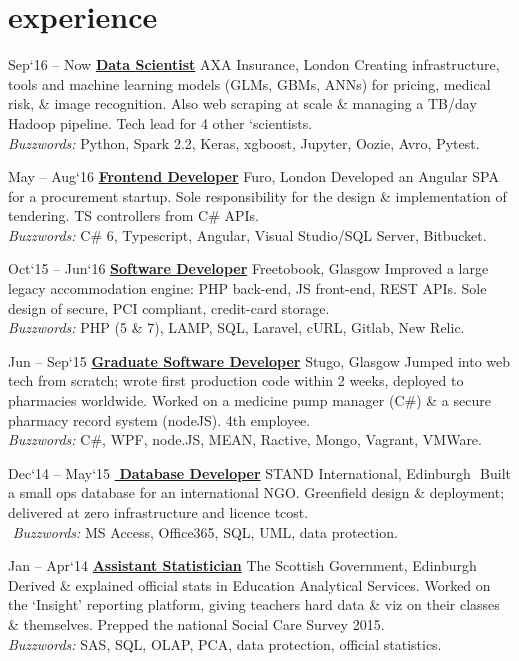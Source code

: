 \documentclass[]{friggeri-cv}
\newcommand{\axaJob}{\href{https://web.archive.org/web/20170113182017/https://www.kaggle.com/jobs/17128/axa-insurance-data-scientist-london}{\textbf{Data Scientist}}}%
\newcommand{\furoJob}{\href{https://web.archive.org/web/20170113184959/https://1.bp.blogspot.com/-8MTHkoAbScc/WHkd2EI0liI/AAAAAAAAC1k/0ZWr2XpO_ewW3Hd1RDHTfv3O_jki3bNigCLcB/s1600/furo.png}{\textbf{\textbf{Frontend Developer}}}}%
\newcommand{\freeJob}{\href{http://web.archive.org/web/20170113190649/http://www.freetobook.com/}{\textbf{Software Developer}}}%
\newcommand{\stugoJob}{\href{http://web.archive.org/web/20170113185418/http://stugo.co.uk/}{\textbf{Graduate Software Developer}}}%
\newcommand{\govJob}{\href{http://web.archive.org/web/20170113190449/http://www.gov.scot/Resource/0047/00478784.pdf}{\textbf{Assistant Statistician}}}%
\newcommand{\standJob}{\href{http://web.archive.org/web/20170113190135/http://standinternational.org/about-us}{\textbf{\,\,Database Developer}}}%
\begin{document}
\section{experience}
\begin{entrylist}
	\smallskip\smallskip
	\entry
	{Sep‘16 – Now}
	{\axaJob{}}
    {AXA Insurance, London}
    {Creating infrastructure, tools and machine learning models (GLMs, GBMs, ANNs) for pricing, medical risk, \& image recognition. Also web scraping at scale \& managing a TB/day Hadoop pipeline. Tech lead for 4 other `scientists.\\
     \textit{Buzzwords:}	Python, Spark 2.2, Keras, xgboost, Jupyter, Oozie, Avro,  Pytest. }		
    
    \smallskip\smallskip    \smallskip\smallskip \smallskip\smallskip
	\entry
	{May – Aug‘16}
	{\furoJob{}}
    {Furo, London}
    {Developed an Angular SPA for a procurement startup. Sole responsibility for the design \& implementation of tendering. TS controllers from C\# APIs. \\
    \textit{Buzzwords:}	C\# 6, Typescript, Angular, Visual Studio/SQL Server, Bitbucket. }	
    \smallskip\smallskip\smallskip\smallskip \smallskip\smallskip
    
    \entry
	{Oct‘15 – Jun‘16}
	{\freeJob{}}
    {Freetobook, Glasgow}
    { Improved a large legacy accommodation engine: PHP back-end, JS front-end, REST APIs.
    Sole design of secure, PCI compliant, credit-card storage. \\
	\textit{Buzzwords:}	PHP (5 \& 7), LAMP, SQL, Laravel, cURL, Gitlab, New Relic. }	
	\smallskip\smallskip	\smallskip\smallskip	\smallskip\smallskip
	
	\entry
	{Jun – Sep‘15}
	{\stugoJob{}}
    {Stugo, Glasgow}
    { Jumped into web tech from scratch; wrote first production code within 2 weeks, deployed to pharmacies worldwide. Worked on a medicine pump manager (C\#) \& a secure pharmacy record system (nodeJS). 4th employee. 
    \\
	\textit{Buzzwords:}	C\#, WPF, node.JS, MEAN, Ractive, Mongo, Vagrant, VMWare. }	
	\smallskip\smallskip	\smallskip\smallskip	\smallskip\smallskip
	
	\entry
	{Dec‘14 – May‘15}
	{\standJob{}}
    {STAND International, Edinburgh}
    {\,\,Built a small ops database for an international NGO. Greenfield design \& deployment; delivered at zero infrastructure and licence tcost. \\
	\,\,\textit{Buzzwords:}	MS Access, Office365, SQL, UML, data protection. }
	\smallskip\smallskip	\smallskip\smallskip	\smallskip\smallskip
	
	\entry
	{Jan – Apr‘14}
	{\govJob{}}
    {The Scottish Government, Edinburgh}
    {Derived \& explained official stats in Education Analytical Services. Worked on the `Insight' reporting platform, giving teachers hard data \& viz on their classes \& themselves. Prepped the national Social Care Survey 2015. \\
	\textit{Buzzwords:}	SAS, SQL, OLAP, PCA, data protection, official statistics. }\\
\end{entrylist}
% 
\\\\
\end{document}
